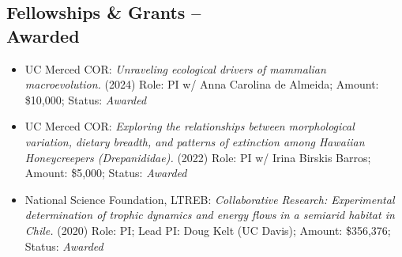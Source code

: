 \documentclass[margin,line,12pt]{res}
\begin{document}
\begin{resume}






\section{\sc Fellowships \& Grants -- \\ Awarded}
\begin{itemize}

\item UC Merced COR: \emph{Unraveling ecological drivers of mammalian macroevolution.} (2024) Role: PI w/ Anna Carolina de Almeida; Amount: \$10,000; Status: \emph{Awarded}

\item UC Merced COR: \emph{Exploring the relationships between morphological variation, dietary breadth, and patterns of extinction among Hawaiian Honeycreepers (Drepanididae).} (2022) Role: PI w/ Irina Birskis Barros; Amount: \$5,000; Status: \emph{Awarded}
  
\item National Science Foundation, LTREB: \emph{Collaborative Research: Experimental determination of trophic dynamics and energy flows in a semiarid habitat in Chile.} (2020) Role: PI; Lead PI: Doug Kelt (UC Davis); Amount: \$356,376; Status: \emph{Awarded}


\end{itemize}
\end{resume}
\end{document}

